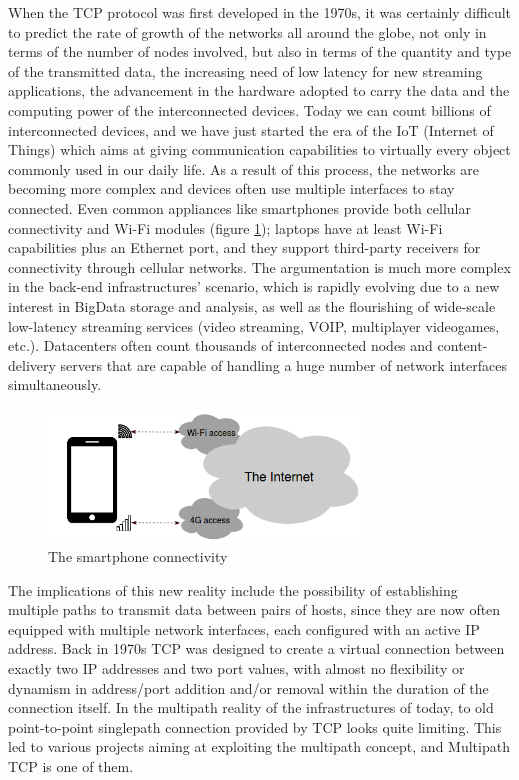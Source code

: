 \vspace{5mm}
When the TCP protocol was first developed in the 1970s, it was certainly difficult to predict the rate of growth of the networks all around the globe, not only in terms of the number of nodes involved, but also in terms of the quantity and type of the transmitted data, the increasing need of low latency for new streaming applications, the advancement in the hardware adopted to carry the data and the computing power of the interconnected devices. Today we can count billions of interconnected devices, and we have just started the era of the IoT (Internet of Things) which aims at giving communication capabilities to virtually every object commonly used in our daily life.
As a result of this process, the networks are becoming more complex and devices often use multiple interfaces to stay connected. Even common appliances like smartphones provide both cellular connectivity and Wi-Fi modules (figure \ref{fig:smartphones}); laptops have at least Wi-Fi capabilities plus an Ethernet port, and they support third-party receivers for connectivity through cellular networks. The argumentation is much more complex in the back-end infrastructures' scenario, which is rapidly evolving due to a new interest in BigData storage and analysis, as well as the flourishing of wide-scale low-latency streaming services (video streaming, VOIP, multiplayer videogames, etc.). Datacenters often count thousands of interconnected nodes and content-delivery servers that are capable of handling a huge number of network interfaces simultaneously.

\begin{figure}[!htb]
\centering
\includegraphics[width=0.75\textwidth]{images/smartphones}
\caption{The smartphone connectivity}
\label{fig:smartphones}
\end{figure}

The implications of this new reality include the possibility of establishing multiple paths to transmit data between pairs of hosts, since they are now often equipped with multiple network interfaces, each configured with an active IP address. Back in 1970s TCP was designed to create a virtual connection between exactly two IP addresses and two port values, with almost no flexibility or dynamism in address/port addition and/or removal within the duration of the connection itself. In the multipath reality of the infrastructures of today, to old point-to-point singlepath connection provided by TCP looks quite limiting. This led to various projects aiming at exploiting the multipath concept, and Multipath TCP is one of them.


